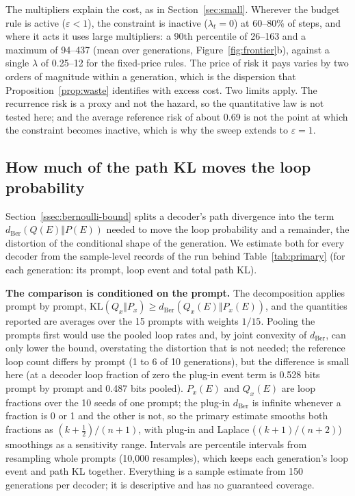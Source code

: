 \documentclass[make,article,submit,pdftex]{Definitions/mdpi}
\providecommand{\KL}{}\renewcommand{\KL}{\mathrm{KL}}
\begin{document}
The multipliers explain the cost, as in Section~\ref{sec:small}. Wherever the budget rule is active ($\varepsilon<1$), the constraint is inactive ($\lambda_t=0$) at 60--80\% of steps, and where it acts it uses large multipliers: a 90th percentile of 26--163 and a maximum of 94--437 (mean over generations, Figure~\ref{fig:frontier}b), against a single $\lambda$ of 0.25--12 for the fixed-price rules. The price of risk it pays varies by two orders of magnitude within a generation, which is the dispersion that Proposition~\ref{prop:waste} identifies with excess cost. Two limits apply. The recurrence risk is a proxy and not the hazard, so the quantitative law is not tested here; and the average reference risk of about 0.69 is not the point at which the constraint becomes inactive, which is why the sweep extends to $\varepsilon=1$.


\subsection{How much of the path KL moves the loop probability}\label{ssec:eventlevel}
Section~\ref{ssec:bernoulli-bound} splits a decoder's path divergence into the term $d_{\mathrm{Ber}}(Q(E)\Vert P(E))$ needed to move the loop probability and a remainder, the distortion of the conditional shape of the generation. We estimate both for every decoder from the sample-level records of the run behind Table~\ref{tab:primary} (for each generation: its prompt, loop event and total path KL).

\textbf{The comparison is conditioned on the prompt.} The decomposition applies prompt by prompt, $\KL(Q_x\Vert P_x)\ge d_{\mathrm{Ber}}(Q_x(E)\Vert P_x(E))$, and the quantities reported are averages over the 15 prompts with weights $1/15$. Pooling the prompts first would use the pooled loop rates and, by joint convexity of $d_{\mathrm{Ber}}$, can only lower the bound, overstating the distortion that is not needed; the reference loop count differs by prompt (1 to 6 of 10 generations), but the difference is small here (at a decoder loop fraction of zero the plug-in event term is 0.528 bits prompt by prompt and 0.487 bits pooled). $P_x(E)$ and $Q_x(E)$ are loop fractions over the 10 seeds of one prompt; the plug-in $d_{\mathrm{Ber}}$ is infinite whenever a fraction is 0 or 1 and the other is not, so the primary estimate smooths both fractions as $(k+\tfrac12)/(n+1)$, with plug-in and Laplace ($(k+1)/(n+2)$) smoothings as a sensitivity range. Intervals are percentile intervals from resampling whole prompts (10{,}000 resamples), which keeps each generation's loop event and path KL together. Everything is a sample estimate from 150 generations per decoder; it is descriptive and has no guaranteed coverage.
\end{document}
